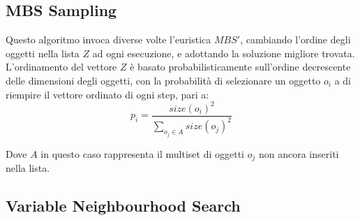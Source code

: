 \documentclass{article}
\begin{document}
\subsection{MBS Sampling}
Questo algoritmo invoca diverse volte l'euristica $MBS'$, cambiando l'ordine degli oggetti nella lista $Z$ ad ogni esecuzione, e adottando la soluzione migliore trovata.
\newline
\newline
L'ordinamento del vettore $Z$ è basato probabilisticamente sull'ordine decrescente delle dimensioni degli oggetti, con la probabilità di selezionare un oggetto $o_i$ a di riempire il vettore ordinato di ogni step, pari a:
\[
p_i = \frac{size(o_i)^{2}}{\sum_{o_{j} \in A }size(o_{j})^{2}}
\]

Dove $A$ in questo caso rappresenta il multiset di oggetti $o_j$ non ancora inseriti nella lista.

\subsection{Variable Neighbourhood Search}



\end{document}
